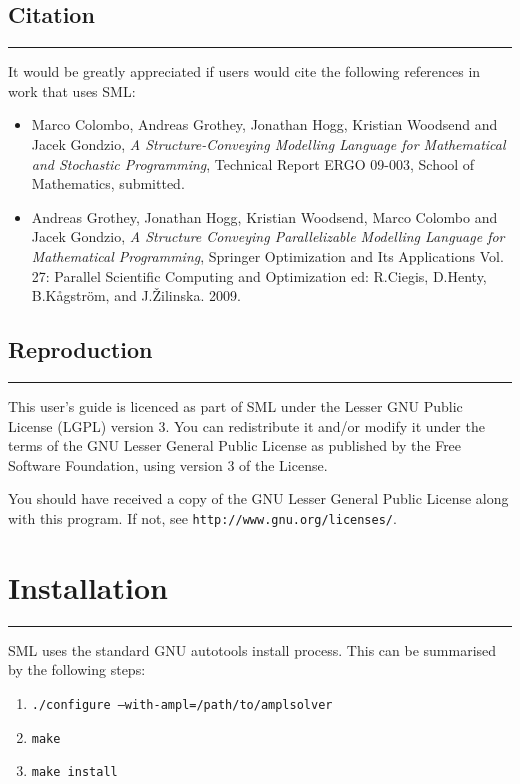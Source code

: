 \documentclass[10pt,a4paper]{book}
\begin{document}
\section*{Citation}
\vspace{-0.6cm}\rule{\textwidth}{0.4ex}\vspace{0.1cm}

\noindent 
It would be greatly appreciated if users would cite the following references
in work that uses SML:
\begin{itemize}
  \item {\sc Marco Colombo, Andreas Grothey, Jonathan Hogg, Kristian Woodsend and Jacek Gondzio}, {\it A Structure-Conveying Modelling Language for Mathematical and Stochastic Programming}, {Technical Report ERGO 09-003, School of Mathematics, submitted.}
   \item {\sc Andreas Grothey, Jonathan Hogg, Kristian Woodsend, Marco Colombo and Jacek Gondzio}, {\it A Structure Conveying Parallelizable Modelling Language for Mathematical Programming}, {Springer Optimization and Its Applications Vol. 27: Parallel Scientific Computing and Optimization ed: R.Ciegis, D.Henty, B.K\r{a}gstr\"{o}m, and J.\v{Z}ilinska. 2009.}
\end{itemize}

\section*{Reproduction}
\vspace{-0.6cm}\rule{\textwidth}{0.4ex}\vspace{0.1cm}
This user's guide is licenced as part of SML under the Lesser GNU Public
License (LGPL) version 3. You can redistribute it and/or modify it under the
terms of the GNU Lesser General Public License as published by the Free
Software Foundation, using version 3 of the License.

You should have received a copy of the GNU Lesser General Public License
along with this program. If not, see {\tt http://www.gnu.org/licenses/}.

\chapter{Installation}
\vspace{-0.6cm}\rule{\textwidth}{0.4ex}\vspace{0.1cm}
SML uses the standard GNU autotools install process. This can be summarised
by the following steps:
\begin{enumerate}
   \item {\tt ./configure --with-ampl=/path/to/amplsolver}
   \item {\tt make}
   \item {\tt make install}
\end{enumerate}
\end{document}
